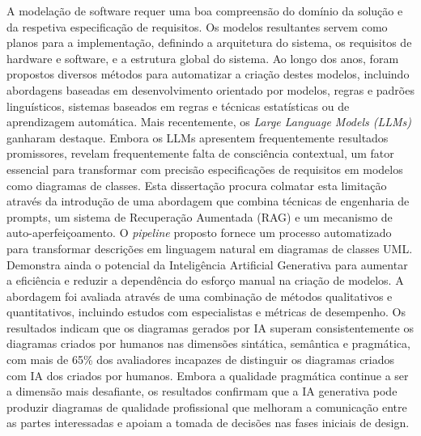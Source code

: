 
%



A modelação de software requer uma boa compreensão do domínio da solução e da respetiva especificação de requisitos. 
Os modelos resultantes servem como planos para a implementação, definindo a arquitetura do sistema, os requisitos de hardware e software, e a estrutura global do sistema. Ao longo dos anos, foram propostos diversos métodos para automatizar a criação destes modelos, incluindo abordagens baseadas em desenvolvimento orientado por modelos, regras e padrões linguísticos, sistemas baseados em regras e técnicas estatísticas ou de aprendizagem automática. 
Mais recentemente, os \textit{Large Language Models (LLMs)} ganharam destaque. 
Embora os LLMs apresentem frequentemente resultados promissores, revelam frequentemente falta de consciência contextual, um fator essencial para transformar com precisão especificações de requisitos em modelos como diagramas de classes.
Esta dissertação procura colmatar esta limitação através da introdução de uma abordagem que combina técnicas de engenharia de prompts, um sistema de Recuperação Aumentada (RAG) e um mecanismo de auto-aperfeiçoamento. O \textit{pipeline} proposto fornece um processo automatizado para transformar descrições em linguagem natural em diagramas de classes UML. 
Demonstra ainda o potencial da Inteligência Artificial Generativa para aumentar a eficiência e reduzir a dependência do esforço manual na criação de modelos.
A abordagem foi avaliada através de uma combinação de métodos qualitativos e quantitativos, incluindo estudos com especialistas e métricas de desempenho. Os resultados indicam que os diagramas gerados por IA superam consistentemente os diagramas criados por humanos nas dimensões sintática, semântica e pragmática, com mais de 65\% dos avaliadores incapazes de distinguir os diagramas criados com IA dos criados por humanos. Embora a qualidade pragmática continue a ser a dimensão mais desafiante, os resultados confirmam que a IA generativa pode produzir diagramas de qualidade profissional que melhoram a comunicação entre as partes interessadas e apoiam a tomada de decisões nas fases iniciais de design.

%
%



